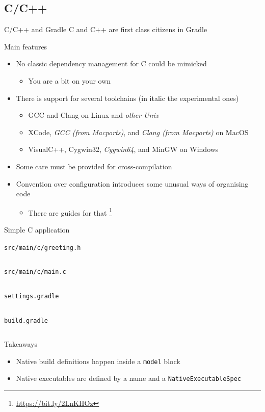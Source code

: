 \documentclass[presentation]{beamer}
\newcommand{\codefile}[4]{
	\begin{block}{\texttt{#2}}
		\inputminted[fontsize=#3,linenos=true,breaklines=true]{#4}{"workspace/#1/#2"}
	\end{block}
}
\newcommand{\ccode}[3]{\codefile{#1}{#2}{#3}{c}}
\newcommand{\groovy}[3]{\codefile{#1}{#2}{#3}{groovy}}
\begin{document}
\subsection{C/C++}

\begin{frame}[fragile]{C/C++ and Gradle}
    C and C++ are first class citizens in Gradle
    \begin{block}{Main features}
        \begin{itemize}
            \item No classic dependency management for C could be mimicked
            \begin{itemize}
                \item You are a bit on your own
            \end{itemize}
            \item There is support for several toolchains (in italic the experimental ones)
            \begin{itemize}
                \item GCC and Clang on Linux and \textit{other Unix}
                \item XCode, \textit{GCC (from Macports)}, and \textit{Clang (from Macports)} on MacOS
                \item VisualC++, Cygwin32, \textit{Cygwin64}, and MinGW on Windows
            \end{itemize}
            \item Some care must be provided for cross-compilation
            \item Convention over configuration introduces some unusual ways of organising code
            \begin{itemize}
                \item There are guides for that \footnote{\url{https://bit.ly/2LnKHOz}}
            \end{itemize}
        \end{itemize}
    \end{block}
\end{frame}

\begin{frame}{Simple C application}
    \ccode{17-C}{src/main/c/greeting.h}{\normalsize}
    \ccode{17-C}{src/main/c/main.c}{\normalsize}
    \groovy{17-C}{settings.gradle}{\normalsize}
    \groovy{17-C}{build.gradle}{\normalsize}
    \begin{block}{Takeaways}
        \begin{itemize}
            \item Native build definitions happen inside a \texttt{model} block
            \item Native executables are defined by a name and a \texttt{NativeExecutableSpec}
        \end{itemize}
    \end{block}
\end{frame}
\end{document}
